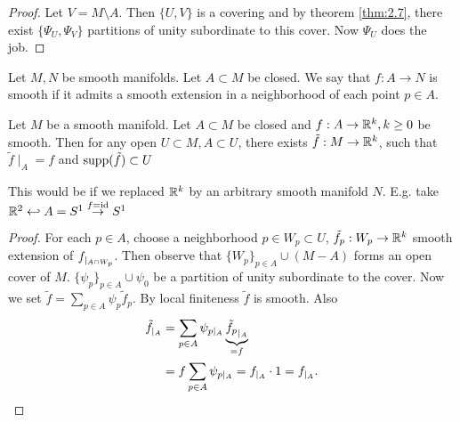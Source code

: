 \begin{proof}
    Let \(V=M\setminus A\). Then \(\{U,V\}\) is a covering and  by theorem \ref{thm:2.7}, there exist 
    \(\{\Psi_U,\Psi_V\}\) partitions of unity subordinate to this cover. Now \(\Psi_U\) does the job.
\end{proof}

\begin{definition*}
    Let \(M,N\) be smooth manifolds. Let \(A\subset M\) be closed. We say that \(f:A\to N\) is smooth 
    if it admits a smooth extension in a neighborhood of each point \(p\in A\). 
\end{definition*}

\begin{proposition}\label{prop:2.9}
    Let \(M\) be a smooth manifold. Let \(A\subset M\) be closed and \(f:A\to\mathbb{R}^k, k\geq 0\) be smooth.
    Then for any open \(U \subset M, A\subset U\), there exists \(\tilde{f}:M\to\mathbb{R}^k\), such that \(\tilde{f}\mid_{A}=f\) and \(\text{supp}(\tilde{f})\subset U\)
\end{proposition}

\begin{remark}
    This would be  if we replaced \(\mathbb{R}^k\) by an arbitrary smooth manifold \(N\). E.g. 
    take \(\mathbb{R}^2\hookleftarrow A=S^1\stackrel{f=\text{id}}{\to}S^1\)
\end{remark}

\begin{proof}
    For each \(p\in A\), choose a neighborhood \(p\in W_p\subset U\), \(\tilde{f}_p:W_p\to\mathbb{R}^k\) smooth 
    extension of \(f_{|_{A\cap W_p}}\). Then observe that \(\{W_p\}_{p\in A}\cup (M-A)\) forms an open cover of \(M\).
    \(\{\psi_p\}_{p\in A}\cup \psi_0\) be a partition of unity subordinate to the cover. Now we set 
    \(\tilde{f}=\sum_{p\in A}\psi_p \tilde{f}_p\). By local finiteness \(\tilde{f}\) is smooth. Also 
    \begin{align*}
        \tilde{f}_{|_{A}}&=\sum_{p\in A} {\psi}_{p\mid_{A}} \underbrace{\tilde{f_p}_{|_{A}}}_{=f}\\
        &=f\sum_{p\in A} {\psi}_{p\mid_{A}} = f_{|_{A}} \cdot 1 = f_{|_{A}} .\qedhere
    \end{align*}
\end{proof}

